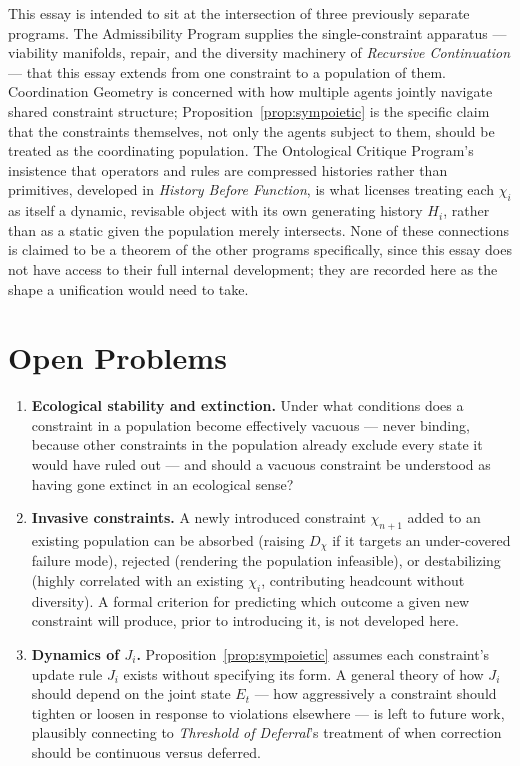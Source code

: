 \documentclass[11pt]{article}
\begin{document}
This essay is intended to sit at the intersection of three previously separate programs. The Admissibility Program supplies the single-constraint apparatus — viability manifolds, repair, and the diversity machinery of \emph{Recursive Continuation} — that this essay extends from one constraint to a population of them. Coordination Geometry is concerned with how multiple agents jointly navigate shared constraint structure; Proposition~\ref{prop:sympoietic} is the specific claim that the constraints themselves, not only the agents subject to them, should be treated as the coordinating population. The Ontological Critique Program's insistence that operators and rules are compressed histories rather than primitives, developed in \emph{History Before Function}, is what licenses treating each $\chi_i$ as itself a dynamic, revisable object with its own generating history $H_i$, rather than as a static given the population merely intersects. None of these connections is claimed to be a theorem of the other programs specifically, since this essay does not have access to their full internal development; they are recorded here as the shape a unification would need to take.

\section*{Open Problems}

\begin{enumerate}
\item \textbf{Ecological stability and extinction.} Under what conditions does a constraint in a population become effectively vacuous — never binding, because other constraints in the population already exclude every state it would have ruled out — and should a vacuous constraint be understood as having gone extinct in an ecological sense?
\item \textbf{Invasive constraints.} A newly introduced constraint $\chi_{n+1}$ added to an existing population can be absorbed (raising $D_\chi$ if it targets an under-covered failure mode), rejected (rendering the population infeasible), or destabilizing (highly correlated with an existing $\chi_i$, contributing headcount without diversity). A formal criterion for predicting which outcome a given new constraint will produce, prior to introducing it, is not developed here.
\item \textbf{Dynamics of $J_i$.} Proposition~\ref{prop:sympoietic} assumes each constraint's update rule $J_i$ exists without specifying its form. A general theory of how $J_i$ should depend on the joint state $E_t$ — how aggressively a constraint should tighten or loosen in response to violations elsewhere — is left to future work, plausibly connecting to \emph{Threshold of Deferral}'s treatment of when correction should be continuous versus deferred.
\end{enumerate}
\end{document}
